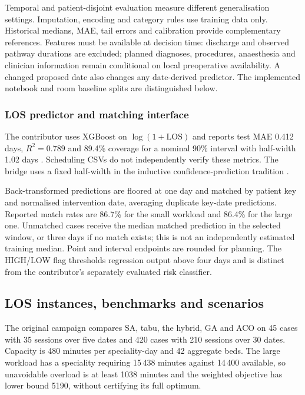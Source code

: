 Temporal and patient-disjoint evaluation measure different generalisation
settings. Imputation, encoding and category
rules use training data only. Historical medians, MAE, tail errors and
calibration provide complementary references. Features must be available
at decision time: discharge and observed pathway durations are excluded;
planned diagnoses, procedures, anaesthesia and clinician information remain
conditional on local preoperative availability. A changed proposed date
also changes any date-derived predictor. The implemented notebook and room
baseline splits are distinguished below.

\subsubsection{LOS predictor and matching interface}

The contributor uses XGBoost \citep{chen2016} on $\log(1+\mathrm{LOS})$ and
reports test MAE 0.412 days, $R^2=0.789$ and 89.4\% coverage for a nominal
90\% interval with half-width 1.02 days \citep{martinez2026los}. Scheduling
CSVs do not independently verify these metrics. The bridge uses a fixed
half-width in the inductive confidence-prediction tradition
\citep{papadopoulos2002}.

Back-transformed predictions are floored at one day and matched by patient
key and normalised intervention date, averaging duplicate key-date predictions.
Reported match rates are 86.7\% for the small workload and 86.4\% for the
large one. Unmatched cases receive the median matched prediction in the
selected window, or three days if no match exists; this is not an independently
estimated training median. Point and interval endpoints are rounded for
planning. The HIGH/LOW flag thresholds regression output above four days
and is distinct from the contributor's separately evaluated risk classifier.

\subsection{LOS instances, benchmarks and scenarios}

The original campaign compares SA, tabu, the hybrid, GA and ACO on 45 cases
with 35 sessions over five dates and 420 cases with 210 sessions over
30 dates. Capacity is 480 minutes per speciality-day and 42 aggregate beds.
The large workload has a speciality requiring 15\,438 minutes against
14\,400 available, so unavoidable overload is at least 1038 minutes and the
weighted objective has lower bound 5190, without certifying its full optimum.


